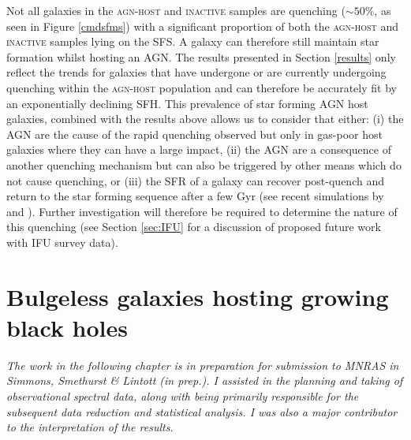 Not all galaxies in the \textsc{agn-host} and \textsc{inactive} samples are quenching ($\sim50\%$, as seen in Figure \ref{cmdsfms}) with a significant proportion of both the \textsc{agn-host} and \textsc{inactive} samples lying on the SFS. A galaxy can therefore still maintain star formation whilst hosting an AGN. The results presented in Section \ref{results} only reflect the trends for galaxies that have undergone or are currently undergoing quenching within the \textsc{agn-host} population and can therefore be accurately fit by an exponentially declining SFH. This prevalence of star forming AGN host galaxies, combined with the results above allows us to consider that either: (i)  the AGN are the cause of the rapid quenching observed but only in gas-poor host galaxies where they can have a large impact, (ii) the AGN are a consequence of another quenching mechanism but can also be triggered by other means which do not cause quenching, or (iii) the SFR of a galaxy can recover post-quench and return to the star forming sequence after a few Gyr (see recent simulations by \citealt{pontzen16} and \citealt{sparre16}). Further investigation will therefore be required to determine the nature of this quenching (see Section \ref{sec:IFU} for a discussion of proposed future work with IFU survey data).


 

\newpage

\section{Bulgeless galaxies hosting growing black holes}\label{sec:intbulgeless}

\emph{The work in the following chapter is in preparation for submission to MNRAS in Simmons, Smethurst \& Lintott (in prep.). I assisted in the planning and taking of observational spectral data, along with being primarily responsible for the subsequent data reduction and statistical analysis. I was also a major contributor to the interpretation of the results.}

